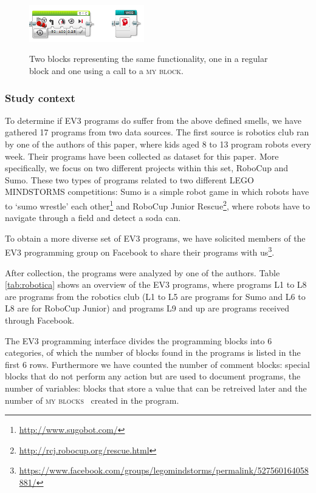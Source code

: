 \documentclass{sig-alternate}
\newcommand{\mbs}{\textsc{my blocks}}
\newcommand{\mb}{\textsc{my block}}
\begin{document}
\begin{figure} [ht]
\caption{Two blocks representing the same functionality, one in a regular block and one using a call to a \mb.}
\centering
\includegraphics[width=5cm]{img/weg}
\label{fig:weg}
\end{figure}

\subsubsection{Study context}
To determine if EV3 programs do suffer from the above defined smells, we have gathered 17 programs from two data sources. The first source is robotics club ran by one of the authors of this paper, where kids aged 8 to 13 program robots every week. Their programs have been collected as dataset for this paper. More specifically, we focus on two different projects within this set, RoboCup and Sumo. These two types of programs related to two different LEGO MINDSTORMS competitions: Sumo is a simple robot game in which robots have to `sumo wrestle' each other\footnote{\url{http://www.sugobot.com/}} and RoboCup Junior Rescue\footnote{\url{http://rcj.robocup.org/rescue.html}}, where robots have to navigate through a field and detect a soda can.

To obtain a more diverse set of EV3 programs, we have solicited members of the EV3 programming group on Facebook to share their programs with us\footnote{\url{https://www.facebook.com/groups/legomindstorms/permalink/527560164058881/}}.

After collection, the programs were analyzed by one of the authors. Table \ref{tab:robotica} shows an overview of the EV3 programs, where programs L1 to L8 are programs from the robotics club (L1 to L5 are programs for Sumo and L6 to L8 are for RoboCup Junior) and programs L9 and up are programs received through Facebook. 

The EV3 programming interface divides the programming blocks into 6 categories, of which the number of blocks found in the programs is listed in the first 6 rows. Furthermore we have counted the number of comment blocks: special blocks that do not perform any action but are used to document programs, the number of variables: blocks that store a value that can be retreived later and the number of \mbs~ created in the program.
\end{document}
